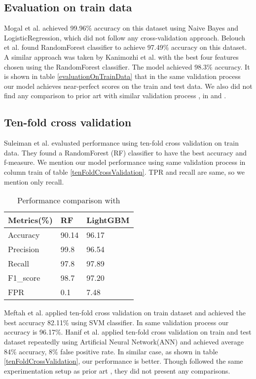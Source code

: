 \documentclass[14pt, conference]{IEEEtran}
\begin{document}
\subsection{Evaluation on train data}
Mogal et al. \cite{mogal2017nids} achieved 99.96\% accuracy on this dataset using Naive Bayes and LogisticRegression,
which did not follow any cross-validation approach. Belouch et al. \cite{belouch2018performance} found RandomForest
classifier to achieve 97.49\% accuracy on this dataset. A similar approach was taken by Kanimozhi et al.
\cite{Kanimozhi2019UNSW-NB15} with the best four features chosen using the RandomForest classifier.
The model achieved 98.3\% accuracy. It is shown in table \ref{evaluationOnTrainData} that in the same validation
process our model achieves near-perfect scores on the train and test data. We also did not find any comparison to
prior art with similar validation process \cite{mogal2017nids}, in \cite{belouch2018performance} and
\cite{Kanimozhi2019UNSW-NB15}.

\subsection{Ten-fold cross validation}
Suleiman et al. \cite{suleiman2018performance} evaluated performance using ten-fold cross validation on train data.
They found a RandomForest (RF) classifier to have the best accuracy and f-measure. We mention our model performance
using same validation process in column train of table \ref{tenFoldCrossValidation}. TPR and recall are same,
so we mention only recall.
\begin{table}
\normalsize
\centering
\caption{Performance comparison with \cite{suleiman2018performance}}
\label{performanceComparisonWithSuleiman}
\renewcommand{\arraystretch}{1.2}
\begin{tabular}{|C{2.3cm}|C{2.2cm}|C{2.2cm}|}
\hline
\textbf{Metrics(\%)} & \textbf{RF \cite{suleiman2018performance}} & \textbf{LightGBM} \\ \hline
Accuracy & 90.14 & 96.17\\ \hline
Precision  & 99.8 & 96.54\\ \hline
Recall  & 97.8 & 97.89\\ \hline
F1\_score  & 98.7 & 97.20\\ \hline
FPR  & 0.1 & 7.48\\ \hline
\end{tabular}
\end{table}

Meftah et al. \cite{meftah2019network} applied ten-fold cross validation on train dataset and achieved the best accuracy
82.11\% using SVM classifier. In same validation process our accuracy is 96.17\%. Hanif et al. \cite{hanif2019intrusion}
applied ten-fold cross validation on train and test dataset repeatedly using Artificial Neural Network(ANN) and achieved
average 84\% accuracy, 8\% false positive rate. In similar case, as shown in table \ref{tenFoldCrossValidation},
our performance is better. Though \cite{meftah2019network}\cite{hanif2019intrusion} followed the same experimentation
setup as prior art \cite{suleiman2018performance}, they did not present any comparisons.
\end{document}
